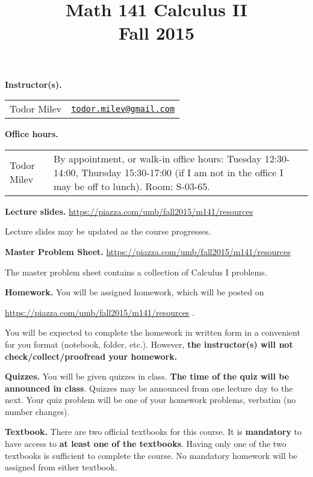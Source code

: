 \documentclass{article}
\title{Math 141 Calculus II \\ Fall 2015}
\date{}
\newcommand{\websitebase}{https://piazza.com/umb/fall2015/m141}
\begin{document}
\maketitle

\noindent \textbf{Instructor(s).} 
\begin{tabular}{ll}
Todor Milev & \href{mailto:todor.milev@gmail.com}{\nolinkurl{todor.milev@gmail.com}} 
\end{tabular}

\medskip
\noindent \textbf{Office hours. } \begin{tabular}{lp{12cm}}
Todor Milev & By appointment, or walk-in office hours: Tuesday 12:30-14:00, Thursday 15:30-17:00 (if I am not in the office I may be off to lunch).  Room: S-03-65.\\
\end{tabular}





\medskip \noindent \textbf{Lecture slides. }  \url{\websitebase/resources}

\medskip\noindent Lecture slides may be updated as the course progresses.


\medskip \noindent \textbf{Master Problem Sheet. }  \url{\websitebase/resources} 

\medskip\noindent The master problem sheet contains a collection of Calculus I problems. 

\medskip
\noindent \textbf{Homework.} You will be assigned homework, which will be posted on

\url{\websitebase/resources} \quad \quad \quad .

\noindent You will be expected to complete the homework in written form in a convenient for you format (notebook, folder, etc.). However, \textbf{the instructor(s) will not check/collect/proofread your homework.} 
 
\medskip
\noindent \textbf{Quizzes.} You will be given quizzes in class. \textbf{The time of the quiz will be announced in class}. Quizzes may be announced from one lecture day to the next. Your quiz problem will be one of your homework problems, verbatim (no number changes).





\medskip\noindent \textbf{Textbook. } There are two official textbooks for this course. It is  \textbf{mandatory} to have access to \textbf{at least one of the textbooks}. Having only one of the two textbooks is sufficient to complete the course. No mandatory homework will be assigned from either textbook. 
\end{document}
